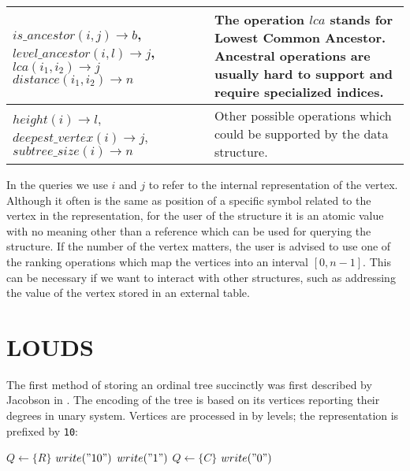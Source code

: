 \begin{tabularx}{\textwidth}{|L{0.7}|L{1.3}|}
	$is\_ancestor(i, j) \rightarrow b$, \newline
	$level\_ancestor(i, l) \rightarrow j$, \newline
	$lca(i_1, i_2) \rightarrow j$
	$distance(i_1, i_2) \rightarrow n$
	& The operation $lca$ stands for Lowest Common Ancestor.
	Ancestral operations are usually hard to support and require specialized indices. \\ \hline
	
	$height(i) \rightarrow l$, \newline
	$deepest\_vertex(i) \rightarrow j$, \newline
	$subtree\_size(i) \rightarrow n$
	& Other possible operations which could be supported by the data structure. \\ \hline
\end{tabularx}

In the queries we use $i$ and $j$ to refer to the internal representation of the vertex.
Although it often is the same as position of a specific symbol related to the vertex in the representation, for the user of the structure it is an atomic value with no meaning other than a reference which can be used for querying the structure.
If the number of the vertex matters, the user is advised to use one of the ranking operations which map the vertices into an interval $[0, n-1]$.
This can be necessary if we want to interact with other structures, such as addressing the value of the vertex stored in an external table.

\section{LOUDS}

The first method of storing an ordinal tree succinctly was first described by Jacobson in .
The encoding of the tree is based on its vertices reporting their degrees in unary system.
Vertices are processed in by levels; the representation is prefixed by \verb|10|:
\begin{algorithmic}
	\State $Q \gets \{R\}$ 
	\State $write("10")$
			\State $write("1")$
			\State $Q \gets \{C\}$
		\EndFor
		\State $write("0")$
	\EndWhile
\EndFunction
\end{algorithmic}

